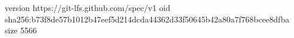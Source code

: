 version https://git-lfs.github.com/spec/v1
oid sha256:b73f8de57b1012b47eef5d214dcda44362d33f50645b42a80a7f768bcee8dfba
size 5566
